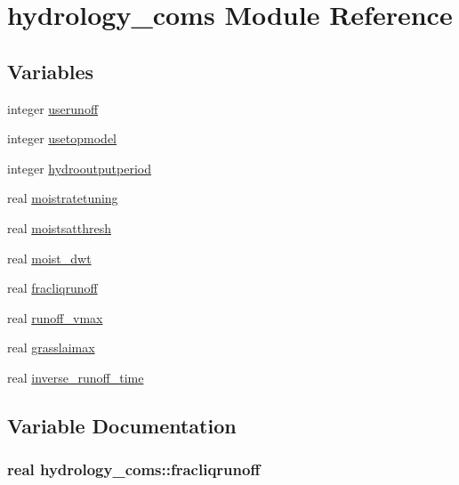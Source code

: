 \hypertarget{namespacehydrology__coms}{}\section{hydrology\+\_\+coms Module Reference}
\label{namespacehydrology__coms}
\subsection*{Variables}
\begin{DoxyCompactItemize}
\item 
integer \hyperlink{namespacehydrology__coms_a072b19b9aec29e8e63c2ad3786bbf6b5}{userunoff}
\item 
integer \hyperlink{namespacehydrology__coms_a20c98af9cfbbd7e0d75c0d2a421fbec7}{usetopmodel}
\item 
integer \hyperlink{namespacehydrology__coms_a348ebb6cbfa8e8217dca91c1e910a611}{hydrooutputperiod}
\item 
real \hyperlink{namespacehydrology__coms_a65f54a2e7ea5015b08a837fd9ffce040}{moistratetuning}
\item 
real \hyperlink{namespacehydrology__coms_a9d7e7e6a1aef383c309cba9b4670a677}{moistsatthresh}
\item 
real \hyperlink{namespacehydrology__coms_aa462c5cf44e4b6d6514539ea959dc840}{moist\+\_\+dwt}
\item 
real \hyperlink{namespacehydrology__coms_a4b086e4a697e284b38cf48df23d29c65}{fracliqrunoff}
\item 
real \hyperlink{namespacehydrology__coms_aa205de3a162ef0ad0200c32e36714a60}{runoff\+\_\+vmax}
\item 
real \hyperlink{namespacehydrology__coms_ab41659cd5c15da7c08da30a343a71d89}{grasslaimax}
\item 
real \hyperlink{namespacehydrology__coms_a1bb2a2286d85f992ccf8dd104ba036a3}{inverse\+\_\+runoff\+\_\+time}
\end{DoxyCompactItemize}


\subsection{Variable Documentation}
\subsubsection[{\texorpdfstring{fracliqrunoff}{fracliqrunoff}}]{\setlength{\rightskip}{0pt plus 5cm}real hydrology\+\_\+coms\+::fracliqrunoff}\hypertarget{namespacehydrology__coms_a4b086e4a697e284b38cf48df23d29c65}{}\label{namespacehydrology__coms_a4b086e4a697e284b38cf48df23d29c65}
